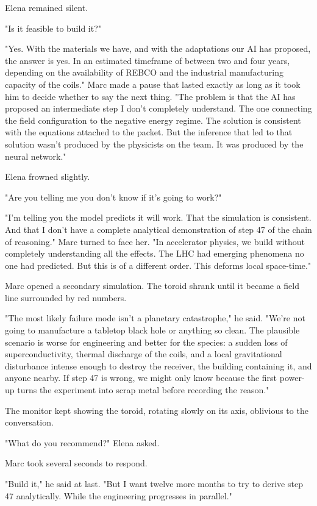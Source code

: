 \documentclass[11pt,a5paper,twoside]{book}
\begin{document}
Elena remained silent.

"Is it feasible to build it?"

"Yes. With the materials we have, and with the adaptations our AI has proposed, the answer is yes. In an estimated timeframe of between two and four years, depending on the availability of REBCO and the industrial manufacturing capacity of the coils." Marc made a pause that lasted exactly as long as it took him to decide whether to say the next thing. "The problem is that the AI has proposed an intermediate step I don't completely understand. The one connecting the field configuration to the negative energy regime. The solution is consistent with the equations attached to the packet. But the inference that led to that solution wasn't produced by the physicists on the team. It was produced by the neural network."

Elena frowned slightly.

"Are you telling me you don't know if it's going to work?"

"I'm telling you the model predicts it will work. That the simulation is consistent. And that I don't have a complete analytical demonstration of step 47 of the chain of reasoning." Marc turned to face her. "In accelerator physics, we build without completely understanding all the effects. The LHC had emerging phenomena no one had predicted. But this is of a different order. This deforms local space-time."

Marc opened a secondary simulation. The toroid shrank until it became a field line surrounded by red numbers.

"The most likely failure mode isn't a planetary catastrophe," he said. "We're not going to manufacture a tabletop black hole or anything so clean. The plausible scenario is worse for engineering and better for the species: a sudden loss of superconductivity, thermal discharge of the coils, and a local gravitational disturbance intense enough to destroy the receiver, the building containing it, and anyone nearby. If step 47 is wrong, we might only know because the first power-up turns the experiment into scrap metal before recording the reason."

The monitor kept showing the toroid, rotating slowly on its axis, oblivious to the conversation.

"What do you recommend?" Elena asked.

Marc took several seconds to respond.

"Build it," he said at last. "But I want twelve more months to try to derive step 47 analytically. While the engineering progresses in parallel."
\end{document}
